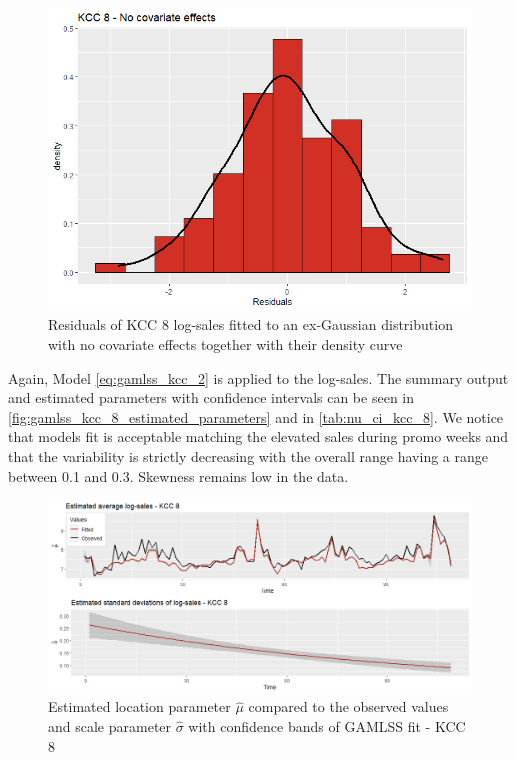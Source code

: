 \begin{figure}[H]
\centering
  \includegraphics[width=0.45\linewidth]{figures/res_kcc_8_no_covariates.png}
  \caption{Residuals of KCC 8 log-sales fitted to an ex-Gaussian distribution with no covariate effects together with their density curve}
  \label{fig:res_kcc_8_no_covariates}
\end{figure}




Again, Model \ref{eq:gamlss_kcc_2} is applied to the log-sales. The summary output and estimated parameters with confidence intervals can be seen in \autoref{fig:gamlss_kcc_8_estimated_parameters} and in \autoref{tab:nu_ci_kcc_8}. We notice that models fit is acceptable matching the elevated sales during promo weeks and that the variability is strictly decreasing with the overall range having a range between 0.1 and 0.3. Skewness remains low in the data.
\\








\begin{figure}[H]
\centering
  \includegraphics[width=0.95\linewidth]{figures/gamlss_kcc_8_estimated_parameters.png}
  \caption{Estimated location parameter $\hat{\mu}$ compared to the observed values and scale parameter $\hat{\sigma}$ with confidence bands of GAMLSS fit - KCC 8}
  \label{fig:gamlss_kcc_8_estimated_parameters}
\end{figure}



